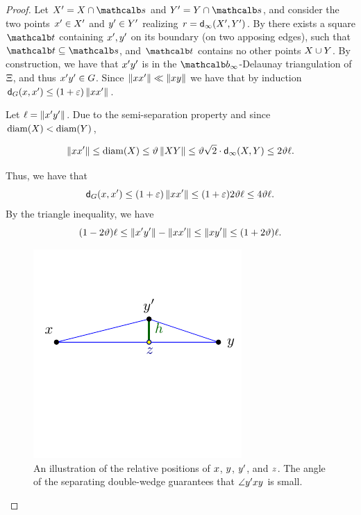 \documentclass[12pt]{article}%
\begin{document}
\begin{proof}
    Let $\PSX' = \PSX \cap \sqr$ and $\PSY' = \PSY \cap \sqr$, and
    consider the two points $x' \in X'$ and $y' \in Y'$
    realizing $r = \dsZ{\infty}{\PSX'}{\PSY'}$. By
     there exists a square $\sqrA$ containing
    $x', y'$ on its boundary (on two apposing edges), such that
    $\sqrA \subseteq \sqr$, and $\sqrA$ contains no other points
    $X \cup Y$. By construction, we have that $x'y'$ is in
    the $\Binfty$-Delaunay triangulation of $\Xi$, and thus
    $x' y' \in G$. Since $\left\| x x' \right\| \ll \left\| x y \right\|$ we
    have that by induction
    $\dGZ{\G}{\px}{\px'} \leq (1+\eps)\dY{\px}{\px'}$.



    Let $\ell = \left\| x' y' \right\|$. Due to the semi-separation property
    and since $\diameterX{\PSX} < \diameterX{\PSY}$,

    \begin{equation*}
        \dY{\px}{\px'}%
        \leq%
        \diameterX{\PSX}%
        \leq%
        \epsA \dY{\PSX}{\PSY}%
        \leq%
        \epsA \sqrt{2} \cdot \dGZ{\infty}{\PSX}{\PSY}%
        \leq
        2
        \epsA \ell.
    \end{equation*}

    Thus, we have that
    \begin{equation*}
        \dGZ{\G}{\px}{\px'}%
        \leq%
        (1+\eps)\dY{\px}{\px'}
        \leq%
        (1+\eps) 2\epsA \ell
        \leq%
        4\epsA \ell.
    \end{equation*}
    By the triangle inequality, we have
    \begin{equation*}
        (1-2\epsA)\ell
        \leq
        \dY{\px'}{\py'} - \dY{\px}{\px'}
        \leq%
        \dY{\px}{\py'}%
        \leq%
        (1+2\epsA)\ell.
    \end{equation*}


    \begin{figure}[h]
        \hfill%
        \includegraphics{figs/triangle}%
        \hfill%
        \phantom{}%
        \caption{An illustration of the relative positions of $x$,
           $y$, $y'$, and $z$. The angle of the separating
           double-wedge guarantees that $\angle y' x y$ is
           small.}
    \end{figure}


\end{proof}
\end{document}
